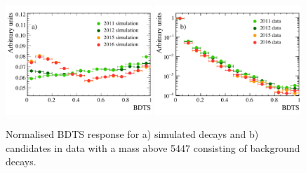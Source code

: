 \begin{figure}[tbp]
    \centering
        \includegraphics[width=0.49\textwidth]{./Figs/Selection/BDTS_signal_Feb6.pdf}
       \includegraphics[width=0.49\textwidth]{./Figs/Selection/BDTS_background_Feb6.pdf}
    \caption{Normalised BDTS response for a) simulated \bsmumu decays and b) \bmumu candidates in data with a mass above 5447 \mevcc consisting of background decays.}
    \label{fig:FlatteningBDTS}
\end{figure}

